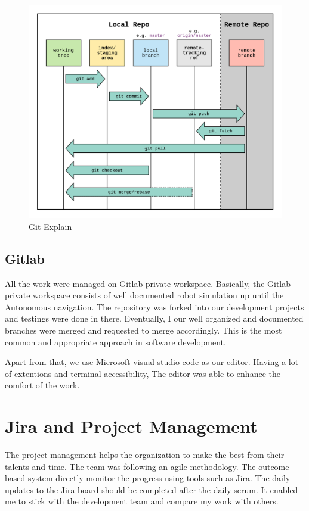 \documentclass[twoside,12pt,times,onecolumn,a4paper]{report}
\begin{document}
\begin{figure}[H]
  \centering
   \includegraphics[width=15cm]{git}
  \caption{Git Explain}
\end{figure}


\subsection{Gitlab}
All the work were managed on Gitlab private workspace. Basically, the Gitlab private workspace consists of well documented robot simulation up until the Autonomous navigation. The repository was forked into our development projects and testings were done in there. Eventually, I our well organized and documented branches were merged and requested to merge accordingly. This is the most common and appropriate approach in software development. 

Apart from that, we use Microsoft visual studio code as our editor. Having a lot of extentions and terminal accessibility, The editor was able to enhance the comfort of the work. 

\section{ Jira and Project Management}

The project management helps the organization to make the best from their talents and time. The team was following an agile methodology. The outcome based system directly monitor the progress using tools such as Jira. The daily updates to the Jira board should be completed after the daily scrum. It enabled me to stick with the development team and compare my work with others. 
\end{document}
